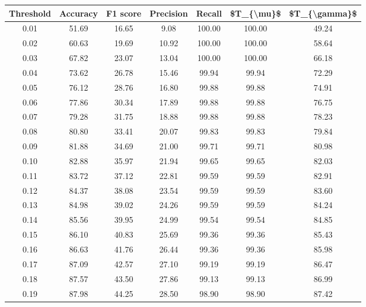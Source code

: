 \begin{tabular}{|c|c|c|c|c|c|c|}
\toprule
 Threshold &  Accuracy &  F1 score &  Precision &  Recall &  \$T\_\{\textbackslash mu\}\$ &  \$T\_\{\textbackslash gamma\}\$ \\
\hline
      0.01 &     51.69 &     16.65 &       9.08 &  100.00 &     100.00 &         49.24 \\
      0.02 &     60.63 &     19.69 &      10.92 &  100.00 &     100.00 &         58.64 \\
      0.03 &     67.82 &     23.07 &      13.04 &  100.00 &     100.00 &         66.18 \\
      0.04 &     73.62 &     26.78 &      15.46 &   99.94 &      99.94 &         72.29 \\
      0.05 &     76.12 &     28.76 &      16.80 &   99.88 &      99.88 &         74.91 \\
      0.06 &     77.86 &     30.34 &      17.89 &   99.88 &      99.88 &         76.75 \\
      0.07 &     79.28 &     31.75 &      18.88 &   99.88 &      99.88 &         78.23 \\
      0.08 &     80.80 &     33.41 &      20.07 &   99.83 &      99.83 &         79.84 \\
      0.09 &     81.88 &     34.69 &      21.00 &   99.71 &      99.71 &         80.98 \\
      0.10 &     82.88 &     35.97 &      21.94 &   99.65 &      99.65 &         82.03 \\
      0.11 &     83.72 &     37.12 &      22.81 &   99.59 &      99.59 &         82.91 \\
      0.12 &     84.37 &     38.08 &      23.54 &   99.59 &      99.59 &         83.60 \\
      0.13 &     84.98 &     39.02 &      24.26 &   99.59 &      99.59 &         84.24 \\
      0.14 &     85.56 &     39.95 &      24.99 &   99.54 &      99.54 &         84.85 \\
      0.15 &     86.10 &     40.83 &      25.69 &   99.36 &      99.36 &         85.43 \\
      0.16 &     86.63 &     41.76 &      26.44 &   99.36 &      99.36 &         85.98 \\
      0.17 &     87.09 &     42.57 &      27.10 &   99.19 &      99.19 &         86.47 \\
      0.18 &     87.57 &     43.50 &      27.86 &   99.13 &      99.13 &         86.99 \\
      0.19 &     87.98 &     44.25 &      28.50 &   98.90 &      98.90 &         87.42 \\

\end{tabular}
